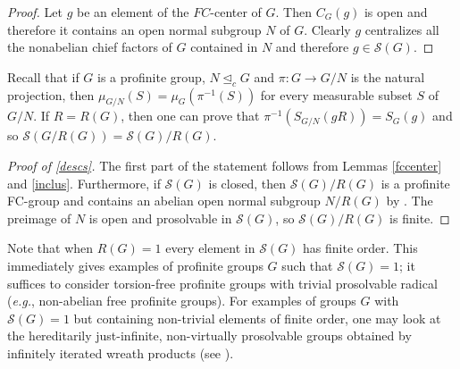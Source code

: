 \documentclass{amsart}
\newtheorem{cor}[thm]{Corollary}
\numberwithin{equation}{section}
\begin{document}
\begin{proof}
Let $g$ be an element of the $FC$-center of $G$. Then $C_G(g)$ is open and therefore it contains an open normal subgroup $N$ of $G$. Clearly $g$ centralizes all the nonabelian chief factors of $G$ contained in $N$ and therefore $g\in \mathcal S(G).$
\end{proof}

Recall that if $G$ is a profinite group, $N \unlhd_c G$ and $\pi \colon G \to G/N$ is the natural projection, then $\mu_{G/N}(S) = \mu_G (\pi^{-1}(S))$ for every measurable subset $S$ of $G/N$. If $R=R(G)$, then one can prove that $\pi^{-1}(S_{G/N}(gR)) = S_G(g)$ and so $\mathcal S(G/R(G)) = \mathcal S(G)/R(G)$.

\begin{proof}[Proof of \cref{descs}]
The first part of the statement  follows from Lemmas \ref{fccenter} and \ref{inclus}. Furthermore, if $\mathcal S(G)$ is closed, then $\mathcal S(G)/R(G)$ is a profinite FC-group and contains an abelian open normal subgroup $N/R(G)$ by \cite[Lemma 2.6]{sh}. The preimage of $N$ is open and prosolvable in $\mathcal S(G)$, so $\mathcal S(G)/R(G)$ is finite.
\end{proof}

Note that when $R(G)=1$ every element in $\mathcal S(G)$ has finite order. This immediately gives examples of profinite groups $G$ such that $\mathcal S(G) = 1$; it suffices to consider torsion-free profinite groups with trivial prosolvable radical (\emph{e.g.}, non-abelian free profinite groups). For examples of groups $G$  with $\mathcal S(G)=1$ but containing non-trivial elements of finite order, one may look at the hereditarily just-infinite, non-virtually prosolvable groups obtained by infinitely iterated wreath products (see \cite{mv}).



\end{document}
